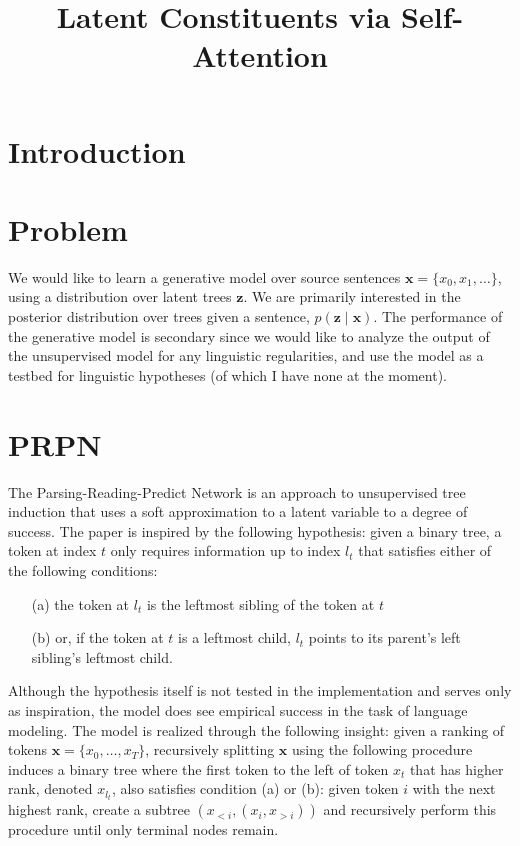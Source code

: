 \documentclass{article}
\title{Latent Constituents via Self-Attention}
\newcommand{\bx}{\mathbf{x}}
\newcommand{\bz}{\mathbf{z}}
\begin{document}
\maketitle

\section{Introduction}


\section{Problem}
We would like to learn a generative model
over source sentences $\bx = \{x_0, x_1, \ldots\}$,
using a distribution over latent trees $\bz$.  
We are primarily interested in the posterior distribution over trees given a sentence, $p(\bz\mid\bx)$.
The performance of the generative model is secondary since we would like to analyze the
output of the unsupervised model for any linguistic regularities, and use the model as a 
testbed for linguistic hypotheses (of which I have none at the moment).

\citep{shen2018prpn}
\citet{yin18structvae}

\section{PRPN \citep{shen2018prpn}}
The Parsing-Reading-Predict Network \citep{shen2018prpn} is an approach to unsupervised tree induction
that uses a soft approximation to a latent variable to a degree of success.
The paper is inspired by the following hypothesis:
given a binary tree, a token at index $t$ only requires information up to index $l_t$ that satisfies
either of the following conditions:
\begin{itemize}
\item[(a)] the token at $l_t$ is the leftmost sibling of the token at $t$
\item[(b)] or, if the token at $t$ is a leftmost child, $l_t$ points to its parent's left sibling's leftmost child.
\end{itemize}
Although the hypothesis itself is not tested in the implementation and serves only as inspiration,
the model does see empirical success in the task of language modeling.
The model is realized through the following insight: given a ranking of tokens $\bx = \{x_0,\ldots,x_T\}$,
recursively splitting $\bx$ using the following procedure induces a binary tree where the first token to the left
of token $x_t$ that has higher rank, denoted $x_{l_t}$, also satisfies condition (a) or (b):
given token $i$ with the next highest rank, create a subtree $(x_{<i}, (x_i, x_{>i}))$ and
recursively perform this procedure until only terminal nodes remain.
\end{document}
